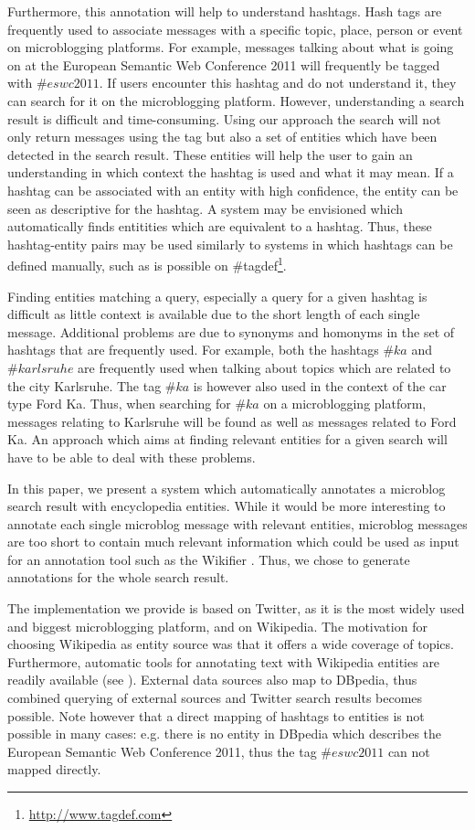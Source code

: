 \documentclass{llncs}
\begin{document}
Furthermore, this annotation will help to understand hashtags. Hash tags are frequently used to associate messages with a specific topic, place, person or event on microblogging platforms. For example, messages talking about what is going on at the European Semantic Web Conference 2011 will frequently be tagged with $\#eswc2011$. If users encounter this hashtag and do not understand it, they can search for it on the microblogging platform. However, understanding a search result is difficult and time-consuming. Using our approach the search will not only return messages using the tag but also a set of entities which have been detected in the search result. These entities will help the user to gain an understanding in which context the hashtag is used and what it may mean. If a hashtag can be associated with an entity with high confidence, the entity can be seen as descriptive for the hashtag. A system may be envisioned which automatically finds entitities which are equivalent to a hashtag. Thus, these hashtag-entity pairs may be used similarly to systems in which hashtags can be defined manually, such as is possible on \#tagdef\footnote{\url{http://www.tagdef.com}}.

Finding entities matching a query, especially a query for a given hashtag is difficult as little context is available due to the short length of each single message. Additional problems are due to synonyms and homonyms in the set of hashtags that are frequently used. For example, both the hashtags $\#ka$ and $\#karlsruhe$ are frequently used when talking about topics which are related to the city Karlsruhe. The tag $\#ka$ is however also used in the context of the car type Ford Ka. Thus, when searching for $\#ka$ on a microblogging platform, messages relating to Karlsruhe will be found as well as messages related to Ford Ka. An approach which aims at finding relevant entities for a given search will have to be able to deal with these problems. 

In this paper, we present a system which automatically annotates a microblog search result with encyclopedia entities. While it would be more interesting to annotate each single microblog message with relevant entities, microblog messages are too short to contain much relevant information which could be used as input for an annotation tool such as the Wikifier \cite{key:wikifier}. Thus, we chose to generate annotations for the whole search result. 

The implementation we provide is based on Twitter, as it is the most widely used and biggest microblogging platform, and on Wikipedia. The motivation for choosing Wikipedia as entity source was that it offers a wide coverage of topics. Furthermore, automatic tools for annotating text with Wikipedia entities are readily available (see \cite{key:wikifier}). External data sources also map to DBpedia, thus combined querying of external sources and Twitter search results becomes possible. Note however that a direct mapping of hashtags to entities is not possible in many cases: e.g. there is no entity in DBpedia which describes the European Semantic Web Conference 2011, thus the tag $\#eswc2011$ can not mapped directly.
\end{document}

